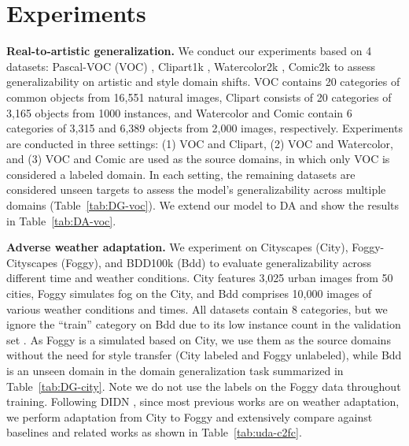 \section{Experiments}
\label{sec:experiments} \textbf{Real-to-artistic generalization.} We conduct our experiments based on 4 datasets: Pascal-VOC (VOC) \cite{pascal-voc-2012,pascal-voc-2007}, Clipart1k \cite{inoue2018cross}, Watercolor2k \cite{inoue2018cross}, Comic2k \cite{inoue2018cross} to assess generalizability on artistic and style domain shifts. VOC contains 20 categories of common objects from 16,551 natural images, Clipart consists of 20 categories of 3,165 objects from 1000 instances, and Watercolor and Comic contain 6 categories of 3,315 and 6,389 objects from 2,000 images, respectively. Experiments are conducted in three settings: (1) VOC and Clipart, (2) VOC and Watercolor, and (3) VOC and Comic are used as the source domains, in which only VOC is considered a labeled domain. In each setting, the remaining datasets are considered unseen targets to assess the model's generalizability across multiple domains (Table~\ref{tab:DG-voc}). We extend our model to DA and show the results in Table~\ref{tab:DA-voc}.

\textbf{Adverse weather adaptation.} We experiment on Cityscapes \cite{Cordts2016Cityscapes} (City), Foggy-Cityscapes \cite{Cordts2016Cityscapes} (Foggy), and BDD100k \cite{bdd100k} (Bdd) to evaluate generalizability across different time and weather conditions. City features 3,025 urban images from 50 cities, Foggy simulates fog on the City, and Bdd comprises 10,000 images of various weather conditions and times. All datasets contain 8 categories, but we ignore the ``train'' category on Bdd due to its low instance count in the validation set \cite{lin2021domain}. As Foggy is a simulated based on City, we use them as the source domains without the need for style transfer (City labeled and Foggy unlabeled), while Bdd is an unseen domain in the domain generalization task summarized in Table~\ref{tab:DG-city}. Note we do not use the labels on the Foggy data throughout training. Following DIDN \cite{lin2021domain}, since most previous works are on weather adaptation, we perform adaptation from City to Foggy and extensively compare against baselines and related works as shown in Table~\ref{tab:uda-c2fc}.

